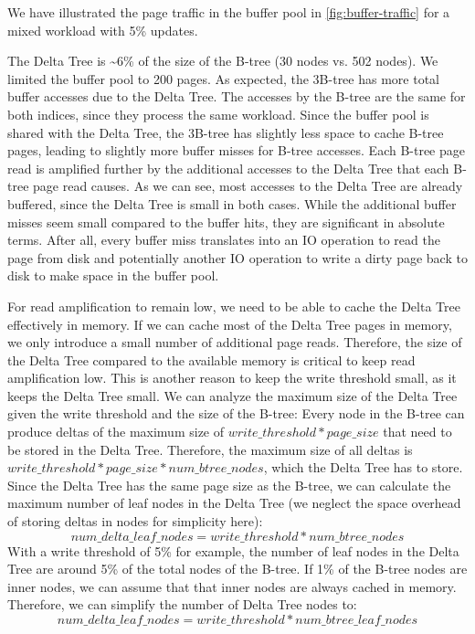 We have illustrated the page traffic in the buffer pool in \autoref{fig:buffer-traffic} for a mixed workload with 5\% updates.

The Delta Tree is \textasciitilde6\% of the size of the B-tree (30 nodes vs. 502 nodes).
We limited the buffer pool to 200 pages.
As expected, the 3B-tree has more total buffer accesses due to the Delta Tree.
The accesses by the B-tree are the same for both indices, since they process the same workload.
Since the buffer pool is shared with the Delta Tree, the 3B-tree has slightly less space to cache B-tree pages, leading to slightly more buffer misses for B-tree accesses.
Each B-tree page read is amplified further by the additional accesses to the Delta Tree that each B-tree page read causes.
As we can see, most accesses to the Delta Tree are already buffered, since the Delta Tree is small in both cases.
While the additional buffer misses seem small compared to the buffer hits, they are significant in absolute terms.
After all, every buffer miss translates into an \ac{IO} operation to read the page from disk and potentially another \ac{IO} operation to write a dirty page back to disk to make space in the buffer pool.

For read amplification to remain low, we need to be able to cache the Delta Tree effectively in memory.
If we can cache most of the Delta Tree pages in memory, we only introduce a small number of additional page reads.
Therefore, the size of the Delta Tree compared to the available memory is critical to keep read amplification low.
This is another reason to keep the write threshold small, as it keeps the Delta Tree small.
We can analyze the maximum size of the Delta Tree given the write threshold and the size of the B-tree:
Every node in the B-tree can produce deltas of the maximum size of $write\_threshold * page\_size$ that need to be stored in the Delta Tree.
Therefore, the maximum size of all deltas is $write\_threshold * page\_size * num\_btree\_nodes$, which the Delta Tree has to store.
Since the Delta Tree has the same page size as the B-tree, we can calculate the maximum number of leaf nodes in the Delta Tree (we neglect the space overhead of storing deltas in nodes for simplicity here):
$$num\_delta\_leaf\_nodes =  write\_threshold * num\_btree\_nodes$$
With a write threshold of 5\% for example, the number of leaf nodes in the Delta Tree are around 5\% of the total nodes of the B-tree.
If 1\% of the B-tree nodes are inner nodes, we can assume that that inner nodes are always cached in memory.
Therefore, we can simplify the number of Delta Tree nodes to:
$$num\_delta\_leaf\_nodes =  write\_threshold * num\_btree\_leaf\_nodes$$

